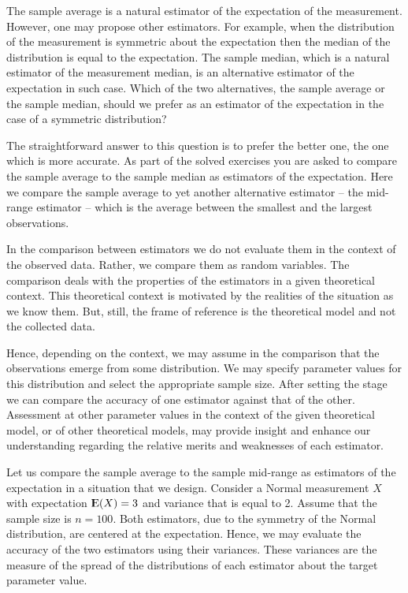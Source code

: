 \documentclass[]{krantz}
\newcommand{\Expec}{{\rm I\kern-.3em E}}
\theoremstyle{definition}
\theoremstyle{definition}
\theoremstyle{definition}
\theoremstyle{remark}
\begin{document}
The sample average is a natural estimator of the expectation of the
measurement. However, one may propose other estimators. For example,
when the distribution of the measurement is symmetric about the
expectation then the median of the distribution is equal to the
expectation. The sample median, which is a natural estimator of the
measurement median, is an alternative estimator of the expectation in
such case. Which of the two alternatives, the sample average or the
sample median, should we prefer as an estimator of the expectation in
the case of a symmetric distribution?

The straightforward answer to this question is to prefer the better one,
the one which is more accurate. As part of the solved exercises you are
asked to compare the sample average to the sample median as estimators
of the expectation. Here we compare the sample average to yet another
alternative estimator -- the mid-range estimator -- which is the average
between the smallest and the largest observations.

In the comparison between estimators we do not evaluate them in the
context of the observed data. Rather, we compare them as random
variables. The comparison deals with the properties of the estimators in
a given theoretical context. This theoretical context is motivated by
the realities of the situation as we know them. But, still, the frame of
reference is the theoretical model and not the collected data.

Hence, depending on the context, we may assume in the comparison that
the observations emerge from some distribution. We may specify parameter
values for this distribution and select the appropriate sample size.
After setting the stage we can compare the accuracy of one estimator
against that of the other. Assessment at other parameter values in the
context of the given theoretical model, or of other theoretical models,
may provide insight and enhance our understanding regarding the relative
merits and weaknesses of each estimator.

Let us compare the sample average to the sample mid-range as estimators
of the expectation in a situation that we design. Consider a Normal
measurement \(X\) with expectation \(\Expec(X) = 3\) and variance that
is equal to 2. Assume that the sample size is \(n = 100\). Both
estimators, due to the symmetry of the Normal distribution, are centered
at the expectation. Hence, we may evaluate the accuracy of the two
estimators using their variances. These variances are the measure of the
spread of the distributions of each estimator about the target parameter
value.
\end{document}
